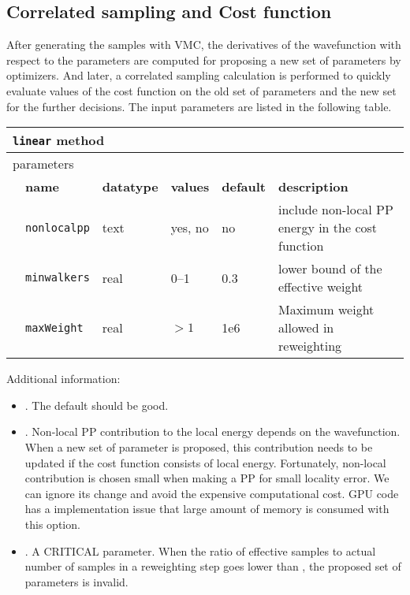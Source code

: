 \subsection{Correlated sampling and Cost function}
After generating the samples with VMC, the derivatives of the wavefunction with respect to the parameters are computed for proposing a new set of parameters by optimizers.
And later, a correlated sampling calculation is performed to quickly evaluate values of the cost function on the old set of parameters and the new set for the further decisions.
The input parameters are listed in the following table.
\begin{table}[h]
\begin{center}
\begin{tabularx}{\textwidth}{l l l l l X }
\hline
\multicolumn{6}{l}{\texttt{linear} method} \\
\hline
\multicolumn{2}{l}{parameters}  & \multicolumn{4}{l}{}\\
   &   \bfseries name     & \bfseries datatype & \bfseries values & \bfseries default   & \bfseries description \\
   &   \texttt{nonlocalpp} &  text     & yes, no & no  & include non-local PP energy in the cost function\\
   &   \texttt{minwalkers} &  real     & 0--1   & 0.3 & lower bound of the effective weight\\
   &   \texttt{maxWeight} &  real     & $>1$   & 1e6 & Maximum weight allowed in reweighting\\
  \hline
\end{tabularx}
\end{center}
\end{table}

Additional information:
\begin{itemize}
\item {}. The default should be good.
\item {}. Non-local PP contribution to the local energy depends on the wavefunction.
When a new set of parameter is proposed, this contribution needs to be updated if the cost function consists of local energy.
Fortunately, non-local contribution is chosen small when making a PP for small locality error.
We can ignore its change and avoid the expensive computational cost.
GPU code has a implementation issue that large amount of memory is consumed with this option.
\item {}. A CRITICAL parameter. When the ratio of effective samples to actual number of samples in a reweighting step goes lower than ,
the proposed set of parameters is invalid. %
\end{itemize}

